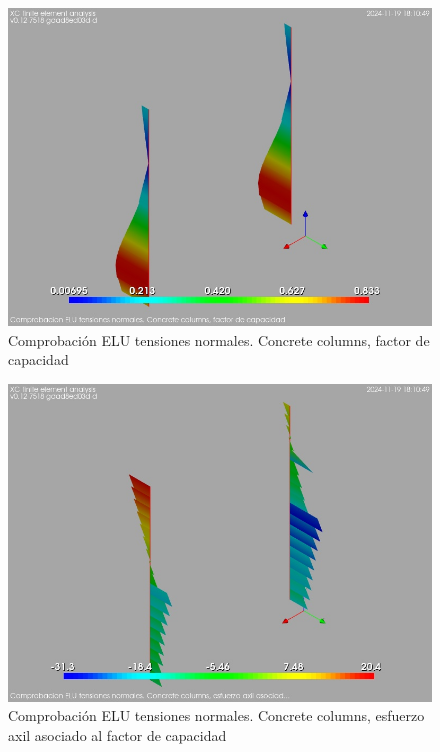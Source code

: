 \begin{figure}[ht]
\begin{center}
\includegraphics[width=\linewidth]{results/graphics/normStrsULS/columnZconcrCF}
\caption{Comprobación ELU tensiones normales. Concrete columns, factor de capacidad}
\label{ULS_normalStressesResistancecolumnZconcrCF}
\end{center}
\end{figure}
\begin{figure}[ht]
\begin{center}
\includegraphics[width=\linewidth]{results/graphics/normStrsULS/columnZconcrN}
\caption{Comprobación ELU tensiones normales. Concrete columns, esfuerzo axil asociado al factor de capacidad}
\label{ULS_normalStressesResistancecolumnZconcrN}
\end{center}
\end{figure}
